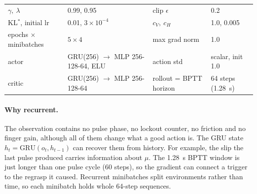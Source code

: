 \documentclass[10.5pt,a4paper]{article}
\begin{document}
\begin{center}\small
\begin{tabular}{llll}
\toprule
$\gamma,\ \lambda$ & 0.99, 0.95 & clip $\epsilon$ & 0.2\\
KL$^*$, initial lr & 0.01, $3\times10^{-4}$ & $c_V,\ c_H$ & 1.0, 0.005\\
epochs $\times$ minibatches & $5\times4$ & max grad norm & 1.0\\
actor & GRU(256) $\to$ MLP 256-128-64, ELU & action std & scalar, init 1.0\\
critic & GRU(256) $\to$ MLP 256-128-64 & rollout = BPTT horizon & 64 steps (\SI{1.28}{s})\\
\bottomrule
\end{tabular}
\end{center}

\paragraph{Why recurrent.} The observation contains no pulse phase, no lockout counter, no friction and no finger
gain, although all of them change what a good action is. The GRU state $h_t=\mathrm{GRU}(o_t,h_{t-1})$ can recover
them from history. For example, the slip the last pulse produced carries information about $\mu$. The
\SI{1.28}{s} BPTT window is just longer than one pulse cycle (60 steps), so the gradient can connect a trigger
to the regrasp it caused. Recurrent minibatches split environments rather than time, so each minibatch holds
whole 64-step sequences.
\end{document}

